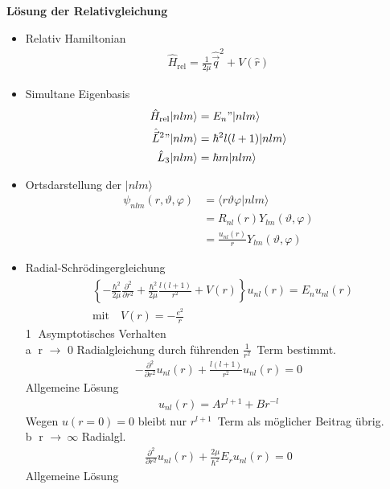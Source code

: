 \documentclass[10pt,article,colorback,accentcolor=tud9d]{scrartcl}
\begin{document}
\noindent\textbf{Lösung der Relativgleichung}
\begin{itemize}
	\item Relativ Hamiltonian
    \begin{align}
    \hat{H}_\text{rel}=\frac{1}{2\mu}\hat{\vec{q}}^2+V(\hat{r})
    \end{align}
  \item Simultane Eigenbasis 
    \begin{align}
    \hat{H}_\text{rel}|nlm\rangle&=E_n"|nlm\rangle\\
    \hat{\vec{L}}^2"|nlm\rangle&=\hbar^2l(l+1)|nlm\rangle\\
    \hat{L}_3|nlm\rangle&=\hbar m|nlm\rangle
    \end{align}
  \item Ortsdarstellung der $|nlm\rangle$
    \begin{align}
    \psi_{nlm}(r,\vartheta,\varphi)&=\langle r\vartheta\varphi|nlm\rangle\\
    &=R_{nl}(r)Y_{lm}(\vartheta,\varphi)\\
    &=\frac{u_{nl}(r)}{r}Y_{lm}(\vartheta,\varphi)
    \end{align}
  \item Radial-Schrödingergleichung
    \begin{align}
    &\left\{-\frac{\hbar^2}{2\mu}\frac{\partial^2}{\partial r^2}+\frac{\hbar^2}{2\mu}\frac{l(l+1)}{r^2}+V(r)\right\}u_{nl}(r)=E_nu_{nl}(r)\\
    &\text{mit}\quad V(r)=-\frac{e^2}{r}
    \end{align}
    \textcircled{1} Asymptotisches Verhalten\\
    \textcircled{a} r $\rightarrow$ 0 Radialgleichung durch führenden $\frac{1}{r^2}$~Term bestimmt.
    \begin{align}
    -\frac{\partial^2}{\partial r^2}u_{nl}(r)+\frac{l(l+1)}{r^2}u_{nl}(r)=0
    \end{align}
    Allgemeine Lösung
    \begin{align}
    u_{nl}(r)=Ar^{l+1}+Br^{-l}
    \end{align}
    Wegen $u(r=0)=0$ bleibt nur $r^{l+1}$~Term als möglicher Beitrag übrig.\\
    \textcircled{b} r $\rightarrow~\infty$ Radialgl.
    \begin{align}
    \frac{\partial^2}{\partial r^2}u_{nl}(r)+\frac{2\mu}{\hbar^2}E_ru_{nl}(r)=0
    \end{align}
    Allgemeine Lösung
    \begin{align}

\end{align}
\end{itemize}
\end{document}
